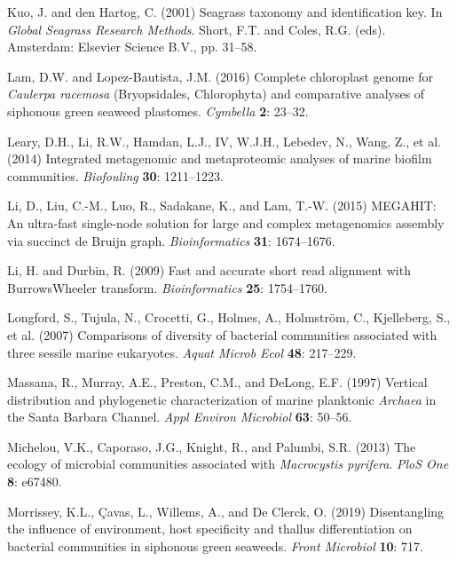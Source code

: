 \documentclass[12pt,]{article}
\begin{document}
\leavevmode\hypertarget{ref-Kuo2001}{}%
Kuo, J. and den Hartog, C. (2001) Seagrass taxonomy and identification
key. In \emph{Global Seagrass Research Methods}. Short, F.T. and Coles,
R.G. (eds). Amsterdam: Elsevier Science B.V., pp. 31--58.

\leavevmode\hypertarget{ref-Lam2016}{}%
Lam, D.W. and Lopez-Bautista, J.M. (2016) Complete chloroplast genome
for \emph{Caulerpa racemosa} (Bryopsidales, Chlorophyta) and comparative
analyses of siphonous green seaweed plastomes. \emph{Cymbella}
\textbf{2}: 23--32.

\leavevmode\hypertarget{ref-Leary2014}{}%
Leary, D.H., Li, R.W., Hamdan, L.J., IV, W.J.H., Lebedev, N., Wang, Z.,
et al. (2014) Integrated metagenomic and metaproteomic analyses of
marine biofilm communities. \emph{Biofouling} \textbf{30}: 1211--1223.

\leavevmode\hypertarget{ref-Li2015}{}%
Li, D., Liu, C.-M., Luo, R., Sadakane, K., and Lam, T.-W. (2015)
MEGAHIT: An ultra-fast single-node solution for large and complex
metagenomics assembly via succinct de Bruijn graph.
\emph{Bioinformatics} \textbf{31}: 1674--1676.

\leavevmode\hypertarget{ref-Li2009a}{}%
Li, H. and Durbin, R. (2009) Fast and accurate short read alignment with
BurrowsWheeler transform. \emph{Bioinformatics} \textbf{25}: 1754--1760.

\leavevmode\hypertarget{ref-Longford2007}{}%
Longford, S., Tujula, N., Crocetti, G., Holmes, A., Holmström, C.,
Kjelleberg, S., et al. (2007) Comparisons of diversity of bacterial
communities associated with three sessile marine eukaryotes. \emph{Aquat
Microb Ecol} \textbf{48}: 217--229.

\leavevmode\hypertarget{ref-Massana1997}{}%
Massana, R., Murray, A.E., Preston, C.M., and DeLong, E.F. (1997)
Vertical distribution and phylogenetic characterization of marine
planktonic \emph{Archaea} in the Santa Barbara Channel. \emph{Appl
Environ Microbiol} \textbf{63}: 50--56.

\leavevmode\hypertarget{ref-Michelou2013}{}%
Michelou, V.K., Caporaso, J.G., Knight, R., and Palumbi, S.R. (2013) The
ecology of microbial communities associated with \emph{Macrocystis
pyrifera}. \emph{PloS One} \textbf{8}: e67480.

\leavevmode\hypertarget{ref-Morrissey2019}{}%
Morrissey, K.L., Çavas, L., Willems, A., and De Clerck, O. (2019)
Disentangling the influence of environment, host specificity and thallus
differentiation on bacterial communities in siphonous green seaweeds.
\emph{Front Microbiol} \textbf{10}: 717.
\end{document}
